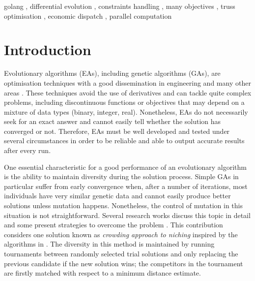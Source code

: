 \documentclass[final,5p,times,twocolumn]{elsarticle}
\begin{document}
\begin{frontmatter}
\begin{abstract}
\end{abstract}



\begin{keyword}

golang \sep
differential evolution \sep
constraints handling \sep
many objectives \sep
truss optimisation \sep
economic dispatch \sep
parallel computation


\end{keyword}



\end{frontmatter}





\section{Introduction}
\label{sec:intro}

Evolutionary algorithms (EAs), including genetic algorithms (GAs), are optimisation techniques with
a good dissemination in engineering and many other areas \citep{gold:89, mwicz:96, deb:01a, tan:05,
coello:07}. These techniques avoid the use of derivatives and can tackle quite complex problems,
including discontinuous functions or objectives that may depend on a mixture of data types (binary,
integer, real). Nonetheless, EAs do not necessarily seek for an exact answer and cannot easily tell
whether the solution has converged or not. Therefore, EAs must be well developed and tested under
several circumstances in order to be reliable and able to output accurate results after every run.

One essential characteristic for a good performance of an evolutionary algorithm is the ability to
maintain diversity during the solution process. Simple GAs in particular suffer from early
convergence when, after a number of iterations, most individuals have very similar genetic data and
cannot easily produce better solutions unless mutation happens. Nonetheless, the control of mutation
in this situation is not straightforward. Several research works discuss this topic in detail and
some present strategies to overcome the problem \citep{gold:87, mahfoud:95, chen:14, elsayed:14}.
This contribution considers one solution known as \emph{crowding approach to niching} inspired by
the algorithms in \citep{meng:08, meng:14}. The diversity in this method is maintained by running
tournaments between randomly selected trial solutions and only replacing the previous candidate if
the new solution wins; the competitors in the tournament are firstly matched with respect to a
minimum distance estimate.
\end{document}
